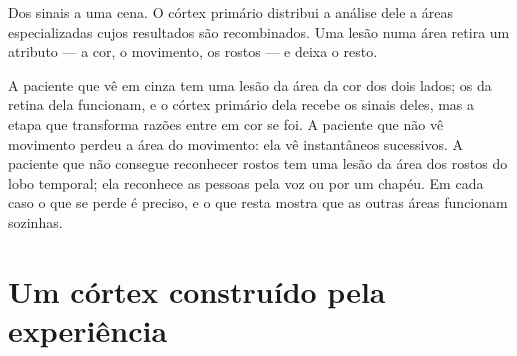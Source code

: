 \begin{omfigure}

{\small Dos sinais a uma cena. O córtex primário distribui a análise
dele a áreas especializadas cujos resultados são recombinados. Uma
lesão numa área retira um atributo --- a cor, o movimento, os rostos
--- e deixa o resto.}
\end{omfigure}

\begin{example}\label{ex:g11:vision-and-brain:patients}
A paciente que vê em cinza tem uma lesão da área da cor dos dois lados;
os  da retina dela funcionam, e o córtex primário dela recebe os
sinais deles, mas a etapa que transforma razões entre  em cor se
foi. A paciente que não vê movimento perdeu a área do movimento: ela vê
instantâneos sucessivos. A paciente que não consegue reconhecer rostos
tem uma lesão da área dos rostos do lobo temporal; ela reconhece as
pessoas pela voz ou por um chapéu. Em cada caso o que se perde é
preciso, e o que resta mostra que as outras áreas funcionam sozinhas.
\end{example}

\section{Um córtex construído pela experiência}

